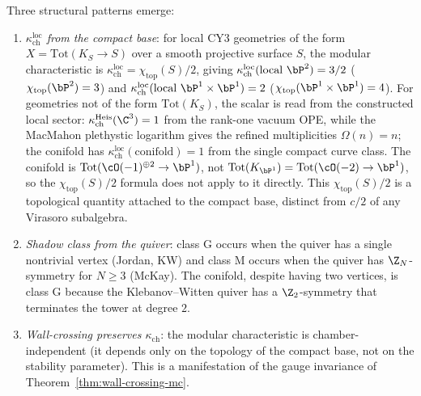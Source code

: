 \begin{remark}
\label{rem:toric-kappa-patterns}
Three structural patterns emerge:
\begin{enumerate}[label=(\roman*)]
 \item \emph{$\kappa_{\mathrm{ch}}^{\mathrm{loc}}$ from the compact base}: for local CY3 geometries of the form $X = \mathrm{Tot}(K_S \to S)$ over a smooth projective surface $S$, the modular characteristic is $\kappa_{\mathrm{ch}}^{\mathrm{loc}} = \chi_{\mathrm{top}}(S)/2$, giving $\kappa_{\mathrm{ch}}^{\mathrm{loc}}(\text{local } \bP^2) = 3/2$ ($\chi_{\mathrm{top}}(\bP^2) = 3$) and $\kappa_{\mathrm{ch}}^{\mathrm{loc}}(\text{local } \bP^1 \times \bP^1) = 2$ ($\chi_{\mathrm{top}}(\bP^1 \times \bP^1) = 4$). For geometries not of the form $\mathrm{Tot}(K_S)$, the scalar is read from the constructed local sector: $\kappa_{\mathrm{ch}}^{\mathrm{Heis}}(\C^3) = 1$ from the rank-one vacuum OPE, while the MacMahon plethystic logarithm gives the refined multiplicities $\Omega(n)=n$; the conifold has $\kappa_{\mathrm{ch}}^{\mathrm{loc}}(\text{conifold}) = 1$ from the single compact curve class. The conifold is $\mathrm{Tot}(\cO(-1)^{\oplus 2} \to \bP^1)$, not $\mathrm{Tot}(K_{\bP^1}) = \mathrm{Tot}(\cO(-2) \to \bP^1)$, so the $\chi_{\mathrm{top}}(S)/2$ formula does not apply to it directly. This $\chi_{\mathrm{top}}(S)/2$ is a topological quantity attached to the compact base, distinct from $c/2$ of any Virasoro subalgebra.
 \item \emph{Shadow class from the quiver}: class G occurs when the quiver has a single nontrivial vertex (Jordan, KW) and class M occurs when the quiver has $\Z_N$-symmetry for $N \geq 3$ (McKay). The conifold, despite having two vertices, is class G because the Klebanov--Witten quiver has a $\Z_2$-symmetry that terminates the tower at degree $2$.
 \item \emph{Wall-crossing preserves $\kappa_{\mathrm{ch}}$}: the modular characteristic is chamber-independent (it depends only on the topology of the compact base, not on the stability parameter). This is a manifestation of the gauge invariance of Theorem~\ref{thm:wall-crossing-mc}.
\end{enumerate}
\end{remark}

